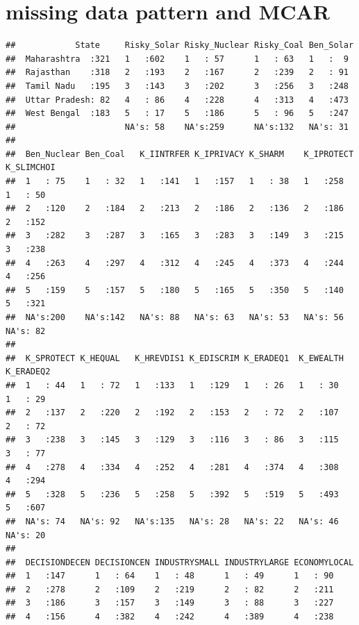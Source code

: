 \documentclass[
]{article}
\begin{document}
\hypertarget{missing-data-pattern-and-mcar}{%
\section{missing data pattern and
MCAR}\label{missing-data-pattern-and-mcar}}

\begin{verbatim}
##            State     Risky_Solar Risky_Nuclear Risky_Coal Ben_Solar 
##  Maharashtra  :321   1   :602    1   : 57      1   : 63   1   :  9  
##  Rajasthan    :318   2   :193    2   :167      2   :239   2   : 91  
##  Tamil Nadu   :195   3   :143    3   :202      3   :256   3   :248  
##  Uttar Pradesh: 82   4   : 86    4   :228      4   :313   4   :473  
##  West Bengal  :183   5   : 17    5   :186      5   : 96   5   :247  
##                      NA's: 58    NA's:259      NA's:132   NA's: 31  
##                                                                     
##  Ben_Nuclear Ben_Coal   K_IINTRFER K_IPRIVACY K_SHARM    K_IPROTECT K_SLIMCHOI
##  1   : 75    1   : 32   1   :141   1   :157   1   : 38   1   :258   1   : 50  
##  2   :120    2   :184   2   :213   2   :186   2   :136   2   :186   2   :152  
##  3   :282    3   :287   3   :165   3   :283   3   :149   3   :215   3   :238  
##  4   :263    4   :297   4   :312   4   :245   4   :373   4   :244   4   :256  
##  5   :159    5   :157   5   :180   5   :165   5   :350   5   :140   5   :321  
##  NA's:200    NA's:142   NA's: 88   NA's: 63   NA's: 53   NA's: 56   NA's: 82  
##                                                                               
##  K_SPROTECT K_HEQUAL   K_HREVDIS1 K_EDISCRIM K_ERADEQ1  K_EWEALTH  K_ERADEQ2 
##  1   : 44   1   : 72   1   :133   1   :129   1   : 26   1   : 30   1   : 29  
##  2   :137   2   :220   2   :192   2   :153   2   : 72   2   :107   2   : 72  
##  3   :238   3   :145   3   :129   3   :116   3   : 86   3   :115   3   : 77  
##  4   :278   4   :334   4   :252   4   :281   4   :374   4   :308   4   :294  
##  5   :328   5   :236   5   :258   5   :392   5   :519   5   :493   5   :607  
##  NA's: 74   NA's: 92   NA's:135   NA's: 28   NA's: 22   NA's: 46   NA's: 20  
##                                                                              
##  DECISIONDECEN DECISIONCEN INDUSTRYSMALL INDUSTRYLARGE ECONOMYLOCAL
##  1   :147      1   : 64    1   : 48      1   : 49      1   : 90    
##  2   :278      2   :109    2   :219      2   : 82      2   :211    
##  3   :186      3   :157    3   :149      3   : 88      3   :227    
##  4   :156      4   :382    4   :242      4   :389      4   :238    

\end{verbatim}
\end{document}
